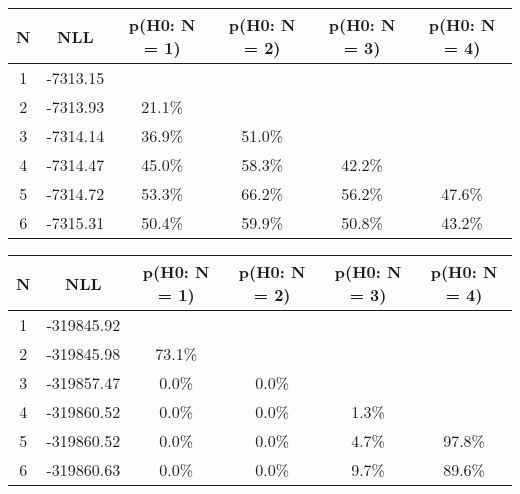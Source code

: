 \begin{table}[htb]
	\begin{center}
{\footnotesize\renewcommand{\arraystretch}{1.4}
		\begin{tabular}{cc||cccc}
			N & NLL & p(H0: N = 1) & p(H0: N = 2) & p(H0: N = 3) & p(H0: N = 4)\\ 
		\hline
1 & -7313.15 & & & & \\
2 & -7313.93 & 21.1\% & & & \\
3 & -7314.14 & 36.9\% & 51.0\% & & \\
4 & -7314.47 & 45.0\% & 58.3\% & 42.2\% & \\
5 & -7314.72 & 53.3\% & 66.2\% & 56.2\% & 47.6\% \\
6 & -7315.31 & 50.4\% & 59.9\% & 50.8\% & 43.2\% \\
	\end{tabular}
		\label{tab:lab}
	}
	\end{center}\end{table}

\begin{table}[htb]
	\begin{center}
{\footnotesize\renewcommand{\arraystretch}{1.4}
		\begin{tabular}{cc||cccc}
			N & NLL & p(H0: N = 1) & p(H0: N = 2) & p(H0: N = 3) & p(H0: N = 4)\\ 
		\hline
1 & -319845.92 & & & & \\
2 & -319845.98 & 73.1\% & & & \\
3 & -319857.47 & 0.0\% & 0.0\% & & \\
4 & -319860.52 & 0.0\% & 0.0\% & 1.3\% & \\
5 & -319860.52 & 0.0\% & 0.0\% & 4.7\% & 97.8\% \\
6 & -319860.63 & 0.0\% & 0.0\% & 9.7\% & 89.6\% \\
	\end{tabular}
		\label{tab:lab}
	}
	\end{center}\end{table}

